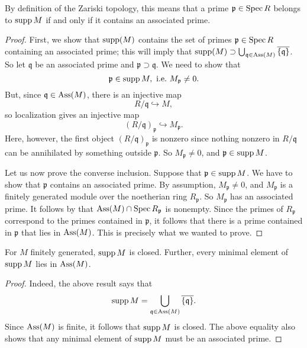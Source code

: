 By definition of the Zariski topology, this means that a prime $\mathfrak{p}
\in \operatorname{Spec} R$ belongs to $\operatorname{supp} M$ if and only if it contains an associated
prime. 

\begin{proof} 
First,  we show that $\operatorname{supp}(M)$ contains the set of primes
$\mathfrak{p} \in \operatorname{Spec} R$ containing an associated prime; this will imply
that $\operatorname{supp}(M) \supset \bigcup_{\mathfrak{q} \in \operatorname{Ass}(M)}
\overline{\left\{\mathfrak{q}\right\}}$. So let $\mathfrak{q}$ be an
associated prime and $\mathfrak{p} \supset \mathfrak{q}$. We need to show that
\[ \mathfrak{p} \in \operatorname{supp} M, \ \text{i.e.} \ M_{\mathfrak{p}} \neq 0.  \]
But, since $\mathfrak{q} \in \operatorname{Ass}(M)$,  there is an injective map
\[ R/\mathfrak{q} \hookrightarrow M , \]
so localization gives an injective map
\[ (R/\mathfrak{q})_{\mathfrak{p}} \hookrightarrow M_{\mathfrak{p}}.  \]
Here, however, the first object $(R/\mathfrak{q})_{\mathfrak{p}}$ is nonzero since nothing nonzero in $R/\mathfrak{q}$ can be
annihilated by something outside $\mathfrak{p}$. So $M_{\mathfrak{p}} \neq
0$, and $\mathfrak{p} \in \operatorname{supp} M$. 

Let us now prove the converse inclusion. Suppose that $\mathfrak{p} \in \operatorname{supp} M$. We
have to show that $\mathfrak{p}$ contains an associated prime.  
By assumption, $M_{\mathfrak{p}} \neq 0$, and $M_{\mathfrak{p}}$ is a finitely generated
module over the noetherian ring $R_{\mathfrak{p}}$. So $M_{\mathfrak{p}}$ has
an associated prime.
It follows by  that $\operatorname{Ass}(M) \cap \operatorname{Spec}
R_{\mathfrak{p}}$ is nonempty. Since the primes of $R_{\mathfrak{p}}$
correspond to the primes contained in $\mathfrak{p}$, it follows that there
is  a prime contained in $\mathfrak{p}$ that lies in $\operatorname{Ass}(M)$. This is
precisely what we wanted to prove.
\end{proof} 


\begin{corollary} \label{suppisclosed} For $M$ finitely generated,  
$\operatorname{supp} M$ is closed. Further, every minimal element of $\operatorname{supp} M$ lies in
$\operatorname{Ass}(M)$.
\end{corollary} 
\begin{proof} 
Indeed, the above result says that
\[ \operatorname{supp} M  = \bigcup_{\mathfrak{q} \in \operatorname{Ass}(M)}
\overline{\left\{\mathfrak{q}\right\}}. \]
Since $\operatorname{Ass}(M)$ is finite, it follows that $\operatorname{supp} M$ is closed.
The above equality also shows that any minimal element of $\operatorname{supp} M$ must be an
associated prime.
\end{proof} 

